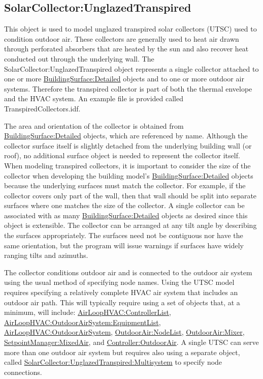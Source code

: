 \subsection{SolarCollector:UnglazedTranspired}\label{solarcollectorunglazedtranspired}

This object is used to model unglazed transpired solar collectors (UTSC) used to condition outdoor air. These collectors are generally used to heat air drawn through perforated absorbers that are heated by the sun and also recover heat conducted out through the underlying wall. The SolarCollector:UnglazedTranspired object represents a single collector attached to one or more \hyperref[buildingsurfacedetailed]{BuildingSurface:Detailed} objects and to one or more outdoor air systems. Therefore the transpired collector is part of both the thermal envelope and the HVAC system. An example file is provided called TranspiredCollectors.idf.

The area and orientation of the collector is obtained from \hyperref[buildingsurfacedetailed]{BuildingSurface:Detailed} objects, which are referenced by name. Although the collector surface itself is slightly detached from the underlying building wall (or roof), no additional surface object is needed to represent the collector itself. When modeling transpired collectors, it is important to consider the size of the collector when developing the building model's \hyperref[buildingsurfacedetailed]{BuildingSurface:Detailed} objects because the underlying surfaces must match the collector. For example, if the collector covers only part of the wall, then that wall should be split into separate surfaces where one matches the size of the collector. A single collector can be associated with as many \hyperref[buildingsurfacedetailed]{BuildingSurface:Detailed} objects as desired since this object is extensible. The collector can be arranged at any tilt angle by describing the surfaces appropriately. The surfaces need not be contiguous nor have the same orientation, but the program will issue warnings if surfaces have widely ranging tilts and azimuths.

The collector conditions outdoor air and is connected to the outdoor air system using the usual method of specifying node names. Using the UTSC model requires specifying a relatively complete HVAC air system that includes an outdoor air path. This will typically require using a set of objects that, at a minimum, will include: \hyperref[airloophvaccontrollerlist]{AirLoopHVAC:ControllerList}, \hyperref[airloophvacoutdoorairsystemequipmentlist]{AirLoopHVAC:OutdoorAirSystem:EquipmentList}, \hyperref[airloophvacoutdoorairsystem]{AirLoopHVAC:OutdoorAirSystem}, \hyperref[outdoorairnodelist]{OutdoorAir:NodeList}, \hyperref[outdoorairmixer]{OutdoorAir:Mixer}, \hyperref[setpointmanagermixedair]{SetpointManager:MixedAir}, and \hyperref[controlleroutdoorair]{Controller:OutdoorAir}. A single UTSC can serve more than one outdoor air system but requires also using a separate object, called \hyperref[solarcollectorunglazedtranspiredmultisystem]{SolarCollector:UnglazedTranspired:Multisystem} to specify node connections.


